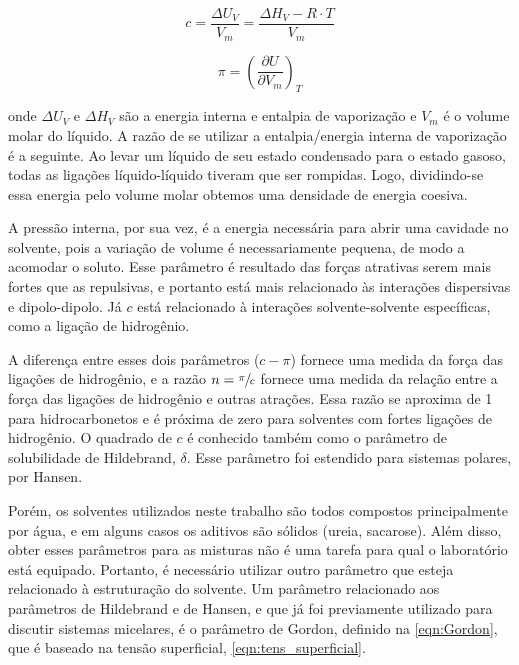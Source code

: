 		\begin{equation}
			c = \dfrac{\Delta U_V}{V_m} = \dfrac{\Delta H_V - R\cdot T}{V_m}
			\label{eqn:densidade_energia_coesiva}
		\end{equation}
		
		\begin{equation}
			\pi = \left( \dfrac{\partial U}{\partial V_m} \right)_T
			\label{eqn:pressao_interna}
		\end{equation}
		
		\noindent onde \(\Delta U_V\) e \(\Delta H_V\) são a energia interna e entalpia de vaporização e \(V_m\) é o volume molar do líquido. A razão de se utilizar a entalpia/energia interna de vaporização é a seguinte. Ao levar um líquido de seu estado condensado para o estado gasoso, todas as ligações líquido-líquido tiveram que ser rompidas. Logo, dividindo-se essa energia pelo volume molar obtemos uma densidade de energia coesiva.\cite{ReichardtSolvents} 
		
		
		A pressão interna, por sua vez, é a energia necessária para abrir uma cavidade no solvente, pois a variação de volume é necessariamente pequena, de modo a acomodar o soluto. Esse parâmetro é resultado das forças atrativas serem mais fortes que as repulsivas, e portanto está mais relacionado às interações dispersivas e dipolo-dipolo. Já \(c\) está relacionado à interações solvente-solvente específicas, como a ligação de hidrogênio.\cite{ReichardtSolvents}
		
		A diferença entre esses dois parâmetros (\(c - \pi\)) fornece uma medida da força das ligações de hidrogênio, e a razão \(n = \sfrac{\pi}{c}\) fornece uma medida da relação entre a força das ligações de hidrogênio e outras atrações. Essa razão se aproxima de 1 para hidrocarbonetos e é próxima de zero para solventes com fortes ligações de hidrogênio. O quadrado de \(c\) é conhecido também como o parâmetro de solubilidade de Hildebrand, \(\delta\). Esse parâmetro foi estendido para sistemas polares, por Hansen.\cite{ReichardtSolvents}
		
		Porém, os solventes utilizados neste trabalho são todos compostos principalmente por água, e em alguns casos os aditivos são sólidos (ureia, sacarose). Além disso, obter esses parâmetros para as misturas não é uma tarefa para qual o laboratório está equipado. Portanto, é necessário utilizar outro parâmetro que esteja relacionado à estruturação do solvente. Um parâmetro relacionado aos parâmetros de Hildebrand e de Hansen, e que já foi previamente utilizado para discutir sistemas micelares,\cite{Moya2007a, Abdel-Rahem2012} é o parâmetro de Gordon, definido na \autoref{eqn:Gordon}, que é baseado na tensão superficial, \autoref{eqn:tens_superficial}.\cite{ReichardtSolvents}

